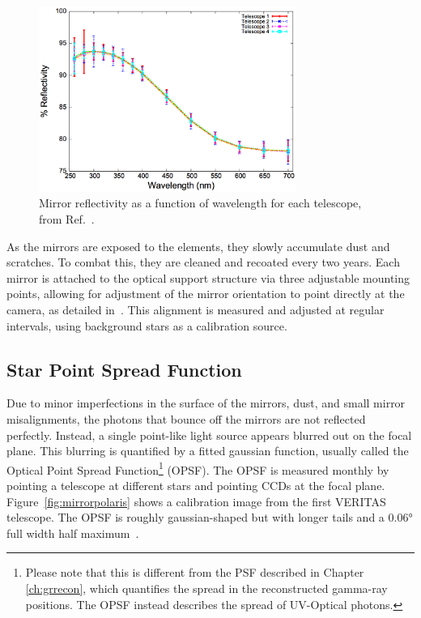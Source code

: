 \begin{figure}[ht]
  \centering
  \includegraphics[width=0.75\textwidth]{images/mirror_reflect}
  \caption[Mirror Reflectivity]{
    Mirror reflectivity as a function of wavelength for each telescope, from Ref.~\cite{mirrorfacets}. 
  }
  \label{fig:mirreflect}
\end{figure}

As the mirrors are exposed to the elements, they slowly accumulate dust and scratches.
To combat this, they are cleaned and recoated every two years.
Each mirror is attached to the optical support structure via three adjustable mounting points, allowing for adjustment of the mirror orientation to point directly at the camera, as detailed in~\cite{mirroralign}.
This alignment is measured and adjusted at regular intervals, using background stars as a calibration source.

\subsection{Star Point Spread Function}

Due to minor imperfections in the surface of the mirrors, dust, and small mirror misalignments, the photons that bounce off the mirrors are not reflected perfectly.
Instead, a single point-like light source appears blurred out on the focal plane.
This blurring is quantified by a fitted gaussian function, usually called the Optical Point Spread Function\footnote{Please note that this is different from the PSF described in Chapter \ref{ch:grrecon}, which quantifies the spread in the reconstructed gamma-ray positions.  The OPSF instead describes the spread of UV-Optical photons.} (OPSF).
The OPSF is measured monthly by pointing a telescope at different stars and pointing CCDs at the focal plane.
Figure~\ref{fig:mirrorpolaris} shows a calibration image from the first VERITAS telescope.
The OPSF is roughly gaussian-shaped but with longer tails and a $ \ang{0.06} $ full width half maximum~\cite{Veritas_Detector}.

